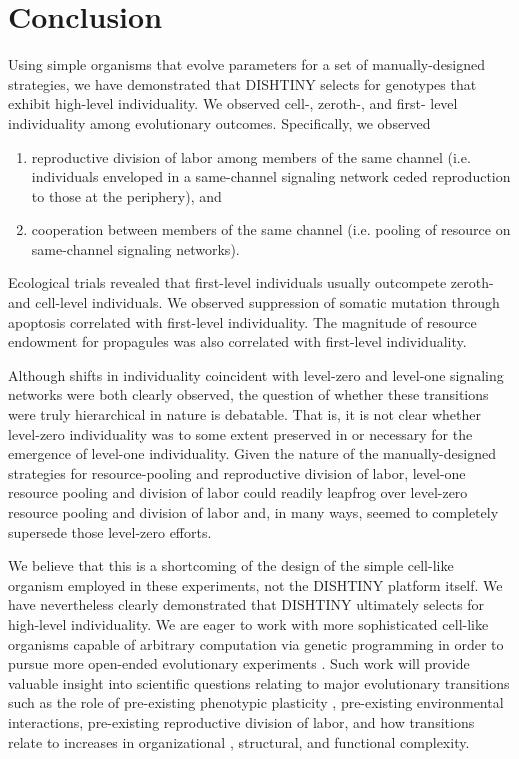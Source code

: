 \section{Conclusion}

Using simple organisms that evolve parameters for a set of manually-designed strategies, we have demonstrated that DISHTINY selects for genotypes that exhibit high-level individuality.
We observed cell-, zeroth-, and first- level individuality among evolutionary outcomes.
Specifically, we observed
\begin{enumerate}
  \item reproductive division of labor among members of the same channel (i.e. individuals enveloped in a same-channel signaling network ceded reproduction to those at the periphery), and
  \item cooperation between members of the same channel (i.e. pooling of resource on same-channel signaling networks).
\end{enumerate}

Ecological trials revealed that first-level individuals usually outcompete zeroth- and cell-level individuals.
We observed suppression of somatic mutation through apoptosis correlated with first-level individuality.
The magnitude of resource endowment for propagules was also correlated with first-level individuality.

Although shifts in individuality coincident with level-zero and level-one signaling networks were both clearly observed, the question of whether these transitions were truly hierarchical in nature is debatable.
That is, it is not clear whether level-zero individuality was to some extent preserved in or necessary for the emergence of level-one individuality.
Given the nature of the manually-designed strategies for resource-pooling and reproductive division of labor, level-one resource pooling and division of labor could readily leapfrog over level-zero resource pooling and division of labor and, in many ways, seemed to completely supersede those level-zero efforts.

We believe that this is a shortcoming of the design of the simple cell-like organism employed in these experiments, not the DISHTINY platform itself.
We have nevertheless clearly demonstrated that DISHTINY ultimately selects for high-level individuality.
We are eager to work with more sophisticated cell-like organisms capable of arbitrary computation via genetic programming in order to pursue more open-ended evolutionary experiments \cite{ofria2004avida}.
Such work will provide valuable insight into scientific questions relating to major evolutionary transitions such as the role of pre-existing phenotypic plasticity \citep{clune2007investigating, lalejini2016evolutionary}, pre-existing environmental interactions, pre-existing reproductive division of labor, and how transitions relate to increases in organizational \citep{goldsby2012task}, structural, and functional \citep{goldsby2014evolutionary} complexity.

